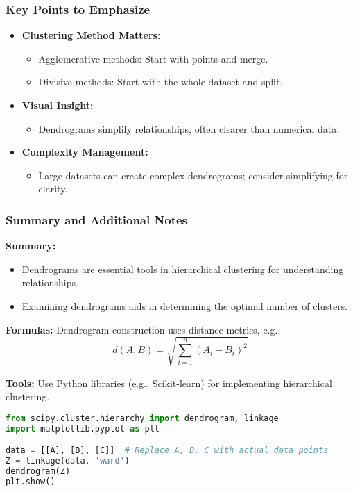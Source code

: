 \documentclass[aspectratio=169]{beamer}
\begin{document}
\begin{frame}[fragile]
    \frametitle{Key Points to Emphasize}
    \begin{itemize}
        \item \textbf{Clustering Method Matters:} 
            \begin{itemize}
                \item Agglomerative methods: Start with points and merge.
                \item Divisive methods: Start with the whole dataset and split.
            \end{itemize}
        \item \textbf{Visual Insight:} 
            \begin{itemize}
                \item Dendrograms simplify relationships, often clearer than numerical data.
            \end{itemize}
        \item \textbf{Complexity Management:}
            \begin{itemize}
                \item Large datasets can create complex dendrograms; consider simplifying for clarity.
            \end{itemize}
    \end{itemize}
\end{frame}

\begin{frame}[fragile]
    \frametitle{Summary and Additional Notes}
    \textbf{Summary:} 
    \begin{itemize}
        \item Dendrograms are essential tools in hierarchical clustering for understanding relationships.
        \item Examining dendrograms aids in determining the optimal number of clusters.
    \end{itemize}
    
    \textbf{Formulas:} Dendrogram construction uses distance metrics, e.g., 
    \begin{equation}
        d(A,B) = \sqrt{\sum_{i=1}^{n} (A_i - B_i)^2}
    \end{equation}
    
    \textbf{Tools:} Use Python libraries (e.g., Scikit-learn) for implementing hierarchical clustering.

    \begin{lstlisting}[language=Python]
from scipy.cluster.hierarchy import dendrogram, linkage
import matplotlib.pyplot as plt

data = [[A], [B], [C]]  # Replace A, B, C with actual data points
Z = linkage(data, 'ward')
dendrogram(Z)
plt.show()
    \end{lstlisting}
\end{frame}
\end{document}
